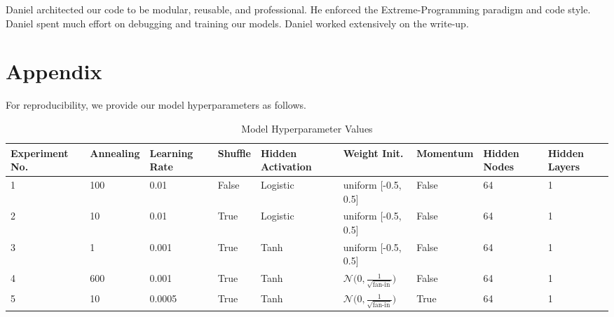 \documentclass{article} %
\begin{document}
{{Daniel architected our code to be modular, reusable, and professional.  He enforced the Extreme-Programming paradigm and code style.  Daniel spent much effort on debugging and training our models.  Daniel worked extensively on the write-up.  



\newpage

\section*{Appendix}

For reproducibility, we provide our model hyperparameters as follows.


\begin{table}[h!]
\small
\centering
\caption{Model Hyperparameter Values}
\label{my-label}
\begin{tabular}{|p{1.5cm}|p{1.3cm}|p{1.3cm}|p{1cm}|p{1cm}|p{1.7cm}|p{1.5cm}|p{1cm}|p{1cm}|}
\hline
\textbf{Experiment No.} & \textbf{Annealing} & \textbf{Learning Rate} & \textbf{Shuffle} & \textbf{Hidden Activation} & \textbf{Weight Init.}    & \textbf{Momentum} & \textbf{Hidden Nodes} & \textbf{Hidden Layers} \\ \hline
1                       & 100                & 0.01                   & False            & Logistic                   & uniform {[}-0.5, 0.5{]}  & False             & 64                    & 1                      \\ \hline
2                       & 10                 & 0.01                   & True             & Logistic                   & uniform {[}-0.5, 0.5{]}  & False             & 64                    & 1                      \\ \hline
3                       & 1                  & 0.001                  & True             & Tanh                       & uniform {[}-0.5, 0.5{]}  & False             & 64                    & 1                      \\ \hline
4                       & 600                & 0.001                  & True             & Tanh                       & $\mathcal{N} \big(0, \frac{1}{\sqrt{\text{fan-in}}} \big)$  & False             & 64                    & 1                      \\ \hline
5                       & 10                 & 0.0005                 & True             & Tanh                       & $\mathcal{N} \big(0, \frac{1}{\sqrt{\text{fan-in}}} \big)$ & True              & 64                    & 1                      \\ \hline

\end{tabular}
\end{table}}}
\end{document}
